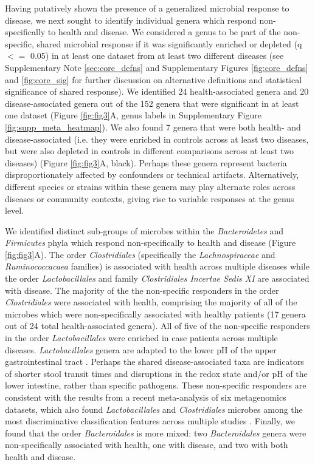 Having putatively shown the presence of a generalized microbial response to disease, we next sought to identify individual genera which respond non-specifically to health and disease.
We considered a genus to be part of the non-specific, shared microbial response if it was significantly enriched or depleted (q $<=$ 0.05) in at least one dataset from at least two different diseases (see Supplementary Note \ref{sec:core_defns} and Supplementary Figures \ref{fig:core_defns} and \ref{fig:core_sig} for further discussion on alternative definitions and statistical significance of shared response).
We identified 24 health-associated genera and 20 disease-associated genera out of the 152 genera that were significant in at least one dataset (Figure \ref{fig:fig3}A, genus labels in Supplementary Figure \ref{fig:supp_meta_heatmap}).
We also found 7 genera that were both health- and disease-associated (i.e. they were enriched in controls across at least two diseases, but were also depleted in controls in different comparisons across at least two diseases) (Figure \ref{fig:fig3}A, black).
Perhaps these genera represent bacteria disproportionately affected by confounders or technical artifacts.
Alternatively, different species or strains within these genera may play alternate roles across diseases or community contexts, giving rise to variable responses at the genus level.

We identified distinct sub-groups of microbes within the \textit{Bacteroidetes} and \textit{Firmicutes} phyla which respond non-specifically to health and disease (Figure \ref{fig:fig3}A).
The order \textit{Clostridiales} (specifically the \textit{Lachnospiraceae} and \textit{Ruminococcacaea} families) is associated with health across multiple diseases while the order \textit{Lactobacillales} and family \textit{Clostridiales Incertae Sedis XI} are associated with disease.
The majority of the the non-specific responders in the order \textit{Clostridiales} were associated with health, comprising the majority of all of the microbes which were non-specifically associated with healthy patients (17 genera out of 24 total health-associated genera).
All of five of the non-specific responders in the order \textit{Lactobacillales} were enriched in case patients across multiple diseases.
\textit{Lactobacillales} genera are adapted to the lower pH of the upper gastrointestinal tract \cite{donaldson2016gut}.
Perhaps the shared disease-associated taxa are indicators of shorter stool transit times and disruptions in the redox state and/or pH of the lower intestine, rather than specific pathogens.
These non-specific responders are consistent with the results from a recent meta-analysis of six metagenomics datasets, which also found \textit{Lactobacillales} and \textit{Clostridiales} microbes among the most discriminative classification features across multiple studies \cite{pasolli2016machine}.
Finally, we found that the order \textit{Bacteroidales} is more mixed: two \textit{Bacteroidales} genera were non-specifically associated with health, one with disease, and two with both health and disease.

